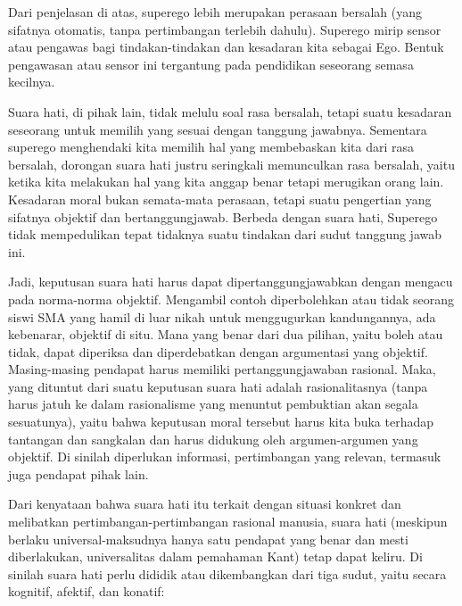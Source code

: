 \documentclass[10pt,a4paper]{article}
\begin{document}
\begin{multicols}{2}
Dari penjelasan di atas, superego lebih merupakan perasaan bersalah
(yang sifatnya otomatis, tanpa pertimbangan terlebih dahulu). Superego
mirip sensor atau pengawas bagi tindakan-tindakan dan kesadaran kita
sebagai Ego. Bentuk pengawasan atau sensor ini tergantung pada
pendidikan seseorang semasa kecilnya.

Suara hati, di pihak lain, tidak melulu soal rasa bersalah, tetapi suatu
kesadaran seseorang untuk memilih yang sesuai dengan tanggung jawabnya.
Sementara superego menghendaki kita memilih hal yang membebaskan kita
dari rasa bersalah, dorongan suara hati justru seringkali memunculkan
rasa bersalah, yaitu ketika kita melakukan hal yang kita anggap benar
tetapi merugikan orang lain. Kesadaran moral bukan semata-mata perasaan,
tetapi suatu pengertian yang sifatnya objektif dan bertanggungjawab.
Berbeda dengan suara hati, Superego tidak mempedulikan tepat tidaknya
suatu tindakan dari sudut tanggung jawab ini.

Jadi, keputusan suara hati harus dapat dipertanggungjawabkan dengan
mengacu pada norma-norma objektif. Mengambil contoh diperbolehkan atau
tidak seorang siswi SMA yang hamil di luar nikah untuk menggugurkan
kandungannya, ada kebenarar, objektif di situ. Mana yang benar dari dua
pilihan, yaitu boleh atau tidak, dapat diperiksa dan diperdebatkan
dengan argumentasi yang objektif. Masing-masing pendapat harus memiliki
pertanggungjawaban rasional. Maka, yang dituntut dari suatu keputusan
suara hati adalah rasionalitasnya (tanpa harus jatuh ke dalam
rasionalisme yang menuntut pembuktian akan segala sesuatunya), yaitu
bahwa keputusan moral tersebut harus kita buka terhadap tantangan dan
sangkalan dan harus didukung oleh argumen-argumen yang objektif. Di
sinilah diperlukan informasi, pertimbangan yang relevan, termasuk juga
pendapat pihak lain.

Dari kenyataan bahwa suara hati itu terkait dengan situasi konkret dan
melibatkan pertimbangan-pertimbangan rasional manusia, suara hati
(meskipun berlaku universal-maksudnya hanya satu pendapat yang benar dan
mesti diberlakukan, universalitas dalam pemahaman Kant) tetap dapat
keliru. Di sinilah suara hati perlu dididik atau dikembangkan dari tiga
sudut, yaitu secara kognitif, afektif, dan konatif:


\end{multicols}
\end{document}
